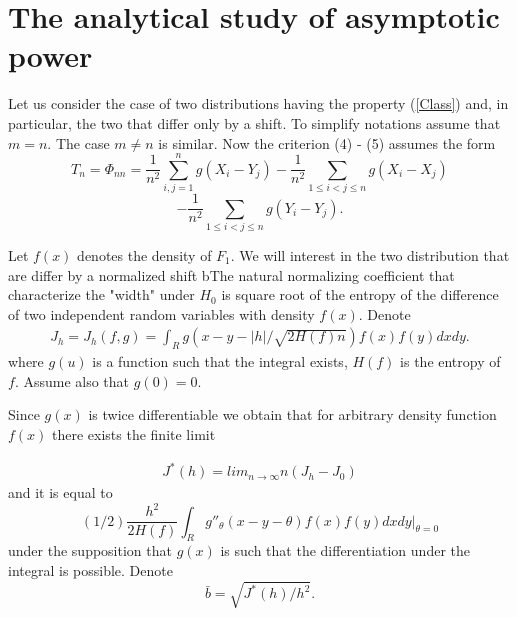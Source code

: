 \documentclass[final,11pt,3p]{elsarticle}
\begin{document}
\section{The analytical study of asymptotic power}
\label{S:2}

Let us consider the case of two distributions having the property (\ref{Class}) 
and, in particular, the two that differ only by a shift. To simplify notations assume that $m=n$. The case $m\ne n$ is similar.
Now the criterion  (4) - (5)  assumes the form
\begin{equation}\label{def}
T_n=\Phi_{nn}= \frac{1}{n^2}\sum_{i,j=1}^n g(X_i - Y_j)-\frac{1}{n^2}\sum_{1\leq i<j\leq n}  g(X_i - X_j)
\end{equation}
\begin{equation}
-  \frac{1}{n^2}\sum_{1\leq i<j\leq n}  g(Y_i - Y_j).
\end{equation}



Let $f(x)$ denotes the density of $F_1$. We will interest in the two distribution that are differ by a normalized  shift bThe natural normalizing coefficient that characterize the "width" under $H_0$ is  square root of the entropy of the difference of two independent random variables with density $f(x)$. 
Denote
\begin{eqnarray}\label{basic}
J_h= J_h (f,g)=\int_R g(x-y-|h|/\sqrt{2H(f)n})   f(x)f(y)dxdy.
\end{eqnarray}
where $g(u)$ is a function such that the integral exists,
$H(f)$ is the entropy of $f$. Assume also that $g(0)=0$.

Since $g(x)$ is twice differentiable we obtain that for arbitrary density function $f(x)$ there exists the finite limit 

\begin{eqnarray}
J^*(h)= lim_{n\to \infty} n(J_h - J_0)
\end{eqnarray}
and it is equal to
\begin{equation}\label{int}
(1/2)\frac {h^2}{2H(f)} \int_R g''_\theta(x-y-\theta)f(x)f(y)dxdy|_{\theta=0}
\end{equation}
under the supposition that $g(x)$ is such that the differentiation under the integral is possible.
Denote
$$
\bar b =\sqrt{J^*(h)/h^2}.
$$
\end{document}
